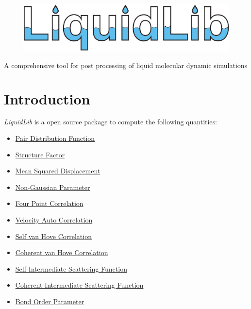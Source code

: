 \documentclass{article}
\begin{document}
	\begin{figure}
		\centering
		\includegraphics[width=.9\textwidth]{./images/LiquidLib_logo.pdf}
	\end{figure}
{
\centering
\Large A comprehensive tool for post processing of liquid molecular dynamic simulations
}
\newpage

\section{Introduction}
\textit{LiquidLib} is a open source package to compute the following quantities:
\begin{itemize}
	\item \hyperref[sec::gofr]{Pair Distribution Function}
	\item \hyperref[sec::sofk]{Structure Factor}
	\item \hyperref[sec::MSD]{Mean Squared Displacement}
	\item \hyperref[sec::alpha2]{Non-Gaussian Parameter}
	\item \hyperref[sec::chi4]{Four Point Correlation}
	\item \hyperref[sec::VACF]{Velocity Auto Correlation}
	\item \hyperref[sec::Gofrt]{Self van Hove Correlation}
	\item \hyperref[sec::Grt]{Coherent van Hove Correlation}
	\item \hyperref[sec::Fsqt]{Self Intermediate Scattering Function}
	\item \hyperref[sec::Fqt]{Coherent Intermediate Scattering Function}
	\item \hyperref[sec::BOP]{Bond Order Parameter}
\end{itemize}
\end{document}
